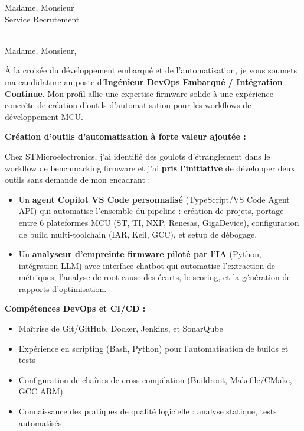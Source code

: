 \documentclass[11pt,a4paper]{letter}
\begin{document}
\begin{letter}{Madame, Monsieur \\ Service Recrutement \\ [Nom de l'entreprise] \\ [Adresse]}

\opening{Madame, Monsieur,}

\`A la crois\'ee du d\'eveloppement embarqu\'e et de l'automatisation, je vous soumets ma candidature au poste d'\textbf{Ing\'enieur DevOps Embarqu\'e / Int\'egration Continue}. Mon profil allie une expertise firmware solide \`a une exp\'erience concr\`ete de cr\'eation d'outils d'automatisation pour les workflows de d\'eveloppement MCU.

\textbf{Cr\'eation d'outils d'automatisation \`a forte valeur ajout\'ee :}

Chez STMicroelectronics, j'ai identifi\'e des goulots d'\'etranglement dans le workflow de benchmarking firmware et j'ai \textbf{pris l'initiative} de d\'evelopper deux outils sans demande de mon encadrant :

\begin{itemize}
\item Un \textbf{agent Copilot VS Code personnalis\'e} (TypeScript/VS Code Agent API) qui automatise l'ensemble du pipeline : cr\'eation de projets, portage entre 6 plateformes MCU (ST, TI, NXP, Renesas, GigaDevice), configuration de build multi-toolchain (IAR, Keil, GCC), et setup de d\'ebogage.

\item Un \textbf{analyseur d'empreinte firmware pilot\'e par l'IA} (Python, int\'egration LLM) avec interface chatbot qui automatise l'extraction de m\'etriques, l'analyse de root cause des \'ecarts, le scoring, et la g\'en\'eration de rapports d'optimisation.
\end{itemize}

\textbf{Comp\'etences DevOps et CI/CD :}

\begin{itemize}
\item Ma\^itrise de Git/GitHub, Docker, Jenkins, et SonarQube
\item Exp\'erience en scripting (Bash, Python) pour l'automatisation de builds et tests
\item Configuration de cha\^ines de cross-compilation (Buildroot, Makefile/CMake, GCC ARM)
\item Connaissance des pratiques de qualit\'e logicielle : analyse statique, tests automatis\'es
\end{itemize}


\end{letter}
\end{document}
